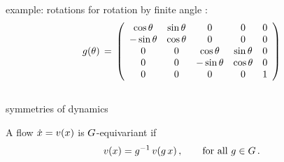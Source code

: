 \documentclass{beamer}
\begin{document}
\begin{frame}{example:  rotations for \cLe}
 rotation by finite angle \gSpace:
\[
\LieEl(\gSpace) \,=\,  \left(\barr{ccccc}
  \cos \gSpace  & \sin \gSpace  & 0 & 0 & 0 \\
 -\sin \gSpace  & \cos \gSpace  & 0 & 0 & 0 \\
 0 & 0 &  \cos \gSpace & \sin \gSpace   & 0 \\
 0 & 0 & -\sin \gSpace & \cos \gSpace   & 0 \\
 0 & 0 & 0             & 0              & 1
    \earr\right)
\] %
\end{frame}

\subsection[in/equivariance]{}

\begin{frame}{symmetries of dynamics}
\begin{block}{A flow $\dot{\ssp}= \vel(\ssp)$ is $\Group$-equivariant if}
\[
\vel(\ssp)=\LieEl^{-1} \, \vel(\LieEl \, \ssp)
\,,\qquad \mbox{for all } \LieEl \in {\Group}
\,.
\] %
\end{block}
\end{frame}
\end{document}
